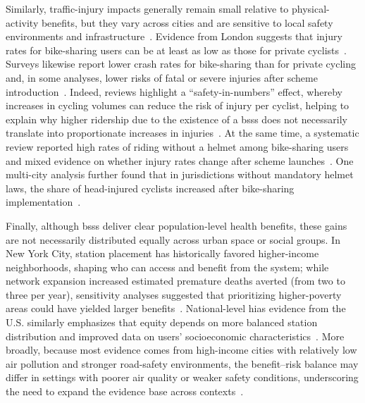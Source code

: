 Similarly, traffic-injury impacts generally remain small relative to physical-activity benefits, but they vary across cities and are sensitive to local safety environments and infrastructure~\cite{Rojas-Rueda2011, Woodcock2014, Otero2018, Clockston2021}. Evidence from London suggests that injury rates for bike-sharing users can be at least as low as those for private cyclists~\cite{Woodcock2014}. Surveys likewise report lower crash rates for bike-sharing than for private cycling and, in some analyses, lower risks of fatal or severe injuries after scheme introduction~\cite{Martin2016, Fishman2016_road_safety}. Indeed, reviews highlight a ``safety-in-numbers'' effect, whereby increases in cycling volumes can reduce the risk of injury per cyclist, helping to explain why higher ridership due to the existence of a \acp{bss} does not necessarily translate into proportionate increases in injuries~\cite{Jacobsen2015, Teixeira2021}. At the same time, a systematic review reported high rates of riding without a helmet among bike-sharing users and mixed evidence on whether injury rates change after scheme launches~\cite{Chen2021}. One multi-city analysis further found that in jurisdictions without mandatory helmet laws, the share of head-injured cyclists increased after bike-sharing implementation~\cite{Graves2014}. 

Finally, although \acp{bss} deliver clear population-level health benefits, these gains are not necessarily distributed equally across urban space or social groups. In New York City, station placement has historically favored higher-income neighborhoods, shaping who can access and benefit from the system; while network expansion increased estimated premature deaths averted (from two to three per year), sensitivity analyses suggested that prioritizing higher-poverty areas could have yielded larger benefits~\cite{Babagoli2019}. National-level \acp{hia} evidence from the U.S. similarly emphasizes that equity depends on more balanced station distribution and improved data on users’ socioeconomic characteristics~\cite{Clockston2021}. More broadly, because most evidence comes from high-income cities with relatively low air pollution and stronger road-safety environments, the benefit--risk balance may differ in settings with poorer air quality or weaker safety conditions, underscoring the need to expand the evidence base across contexts~\cite{Teixeira2021, Tainio2016}.